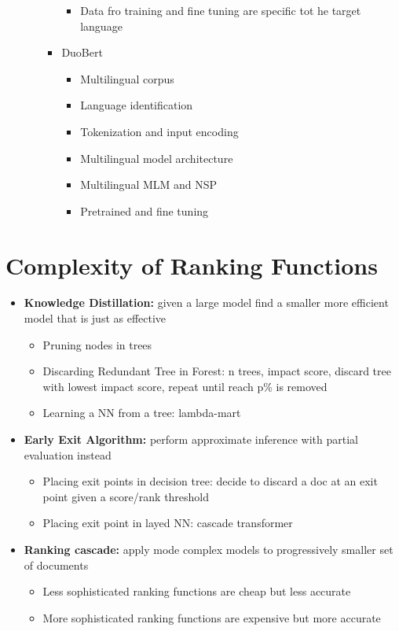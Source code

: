 \documentclass[12pt,oneside]{report}
\begin{document}
\begin{itemize}
\begin{itemize}
\begin{itemize}
\begin{itemize}
                \item  Data fro training and fine tuning are specific tot he target language
            \end{itemize}
            \item DuoBert
            \begin{itemize}
                \item Multilingual corpus
                \item Language identification
                \item Tokenization and input encoding
                \item Multilingual model architecture
                \item Multilingual MLM and NSP
                \item Pretrained and fine tuning
            \end{itemize}
        \end{itemize}
    \end{itemize}
\end{itemize}

\chapter{Complexity of Ranking Functions}
\begin{itemize}
    \item \textbf{Knowledge Distillation:} given a large model find a smaller more efficient model that is just as effective
    \begin{itemize}
        \item Pruning nodes in trees
        \item Discarding Redundant Tree in Forest: n trees, impact score, discard tree with lowest impact score, repeat until reach p\% is removed
        \item Learning a NN from a tree: lambda-mart
    \end{itemize}
    \item \textbf{Early Exit Algorithm:} perform approximate inference with partial evaluation instead
    \begin{itemize}
        \item Placing exit points in decision tree: decide to discard a doc at an exit point given a score/rank threshold
        \item Placing exit point in layed NN: cascade transformer
    \end{itemize}
    \item \textbf{Ranking cascade:} apply mode complex models to progressively smaller set of documents
    \begin{itemize}
        \item Less sophisticated ranking functions are cheap but less accurate
        \item More sophisticated ranking functions are expensive but more accurate
    \end{itemize}
\end{itemize}
\end{document}

